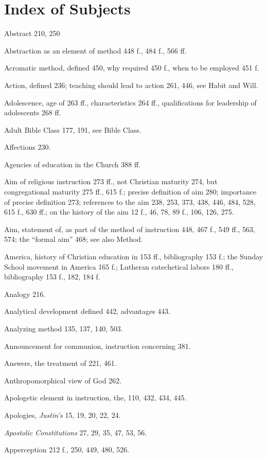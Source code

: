 \chapter{Index of Subjects}

Abstract 210, 250

Abstraction as an element of method 448 f., 484 f., 566 ff.

Acromatic method, defined 450, why required 450 f., when to be employed 451 f.

Action, defined 236; teaching should lead to action 261, 446, see Habit and Will.

Adolescence, age of 263 ff., characteristics 264 ff., qualifications for leadership of adolescents 268 ff.

Adult Bible Class 177, 191, see Bible Class.

Affections 230.

Agencies of education in the Church 388 ff.

Aim of religious instruction 273 ff., not Christian maturity 274, but congregational maturity 275 ff., 615 f.; precise definition of aim 280; importance of precise definition 273; references to the aim 238, 253, 373, 438, 446, 484, 528, 615 f., 630 ff.; on the history of the aim 12 f., 46, 78, 89 f., 106, 126, 275.

Aim, statement of, as part of the method of instruction 448, 467 f., 549 ff., 563, 574; the “formal aim” 468; see also Method.

America, history of Christian education in 153 ff., bibliography 153 f.; the Sunday School movement in America 165 f.; Lutheran catechetical labors 180 ff., bibliography 153 f., 182, 184 f.

Analogy 216.

Analytical development defined 442, advantages 443.

Analyzing method 135, 137, 140, 503.

Announcement for communion, instruction concerning 381.

Answers, the treatment of 221, 461.

Anthropomorphical view of God 262.

Apologetic element in instruction, the, 110, 432, 434, 445.

Apologies, \emph{Justin’s} 15, 19, 20, 22, 24.

\emph{Apostolic Constitutions} 27, 29, 35, 47, 53, 56.

Apperception 212 f., 250, 449, 480, 526.

